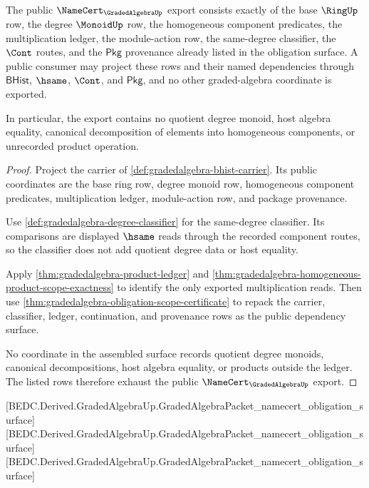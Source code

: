 \begin{theorem}
\label{thm:gradedalgebra-public-dependency-export}
The public $\NameCert_{\GradedAlgebraUp}$ export consists exactly of the base
$\RingUp$ row, the degree $\MonoidUp$ row, the homogeneous component
predicates, the multiplication ledger, the module-action row, the same-degree
classifier, the $\Cont$ routes, and the $\mathsf{Pkg}$ provenance already
listed in the obligation surface. A public consumer may project these rows and
their named dependencies through $\mathsf{BHist}$, $\hsame$, $\Cont$, and
$\mathsf{Pkg}$, and no other graded-algebra coordinate is exported.

In particular, the export contains no quotient degree monoid, host algebra
equality, canonical decomposition of elements into homogeneous components, or
unrecorded product operation.
\end{theorem}
\begin{proof}
Project the carrier of \autoref{def:gradedalgebra-bhist-carrier}. Its public
coordinates are the base ring row, degree monoid row, homogeneous component
predicates, multiplication ledger, module-action row, and package provenance.

Use \autoref{def:gradedalgebra-degree-classifier} for the same-degree
classifier. Its comparisons are displayed $\hsame$ reads through the recorded
component routes, so the classifier does not add quotient degree data or host
equality.

Apply \autoref{thm:gradedalgebra-product-ledger} and
\autoref{thm:gradedalgebra-homogeneous-product-scope-exactness} to identify the
only exported multiplication reads. Then use
\autoref{thm:gradedalgebra-obligation-scope-certificate} to repack the carrier,
classifier, ledger, continuation, and provenance rows as the public dependency
surface.

No coordinate in the assembled surface records quotient degree monoids,
canonical decompositions, host algebra equality, or products outside the
ledger. The listed rows therefore exhaust the public
$\NameCert_{\GradedAlgebraUp}$ export.
\end{proof}

[BEDC.Derived.GradedAlgebraUp.GradedAlgebraPacket\_namecert\_obligation\_surface]
[BEDC.Derived.GradedAlgebraUp.GradedAlgebraPacket\_namecert\_obligation\_surface]
[BEDC.Derived.GradedAlgebraUp.GradedAlgebraPacket\_namecert\_obligation\_surface]

